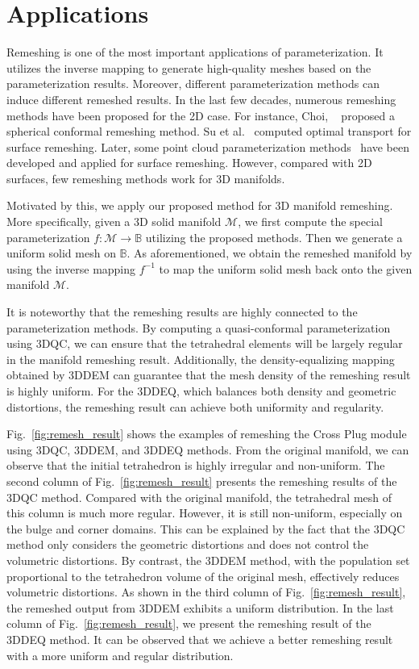 \documentclass{article}
\begin{document}
\section{Applications}\label{sec:applications}
Remeshing is one of the most important applications of parameterization. It utilizes the inverse mapping to generate high-quality meshes based on the parameterization results. Moreover, different parameterization methods can induce different remeshed results. In the last few decades, numerous remeshing methods have been proposed for the 2D case. For instance, Choi, ~\cite{choi2015flash} proposed a spherical conformal remeshing method. Su et al.~\cite{su2019curvature} computed optimal transport for surface remeshing. Later, some point cloud parameterization methods~\cite{lai2025point,choi2016spherical} have been developed and applied for surface remeshing. However, compared with 2D surfaces, few remeshing methods work for 3D manifolds. 

Motivated by this, we apply our proposed method for 3D manifold remeshing. More specifically, given a 3D solid manifold $\mathcal{M}$, we first compute the special parameterization $f:\mathcal{M} \rightarrow \mathbb B$ utilizing the proposed methods. Then we generate a uniform solid mesh on $\mathbb B$. As aforementioned, we obtain the remeshed manifold by using the inverse mapping $f^{-1}$ to map the uniform solid mesh back onto the given manifold $\mathcal{M}$.

It is noteworthy that the remeshing results are highly connected to the parameterization methods. By computing a quasi-conformal parameterization using 3DQC, we can ensure that the tetrahedral elements will be largely regular in the manifold remeshing result. Additionally, the density-equalizing mapping obtained by 3DDEM can guarantee that the mesh density of the remeshing result is highly uniform. For the 3DDEQ, which balances both density and geometric distortions, the remeshing result can achieve both uniformity and regularity. 


Fig.~\ref{fig:remesh_result} shows the examples of remeshing the Cross Plug module using 3DQC, 3DDEM, and 3DDEQ methods. From the original manifold, we can observe that the initial tetrahedron is highly irregular and non-uniform. The second column of Fig.~\ref{fig:remesh_result} presents the remeshing results of the 3DQC method. Compared with the original manifold, the tetrahedral mesh of this column is much more regular. However, it is still non-uniform, especially on the bulge and corner domains. This can be explained by the fact that the 3DQC method only considers the geometric distortions and does not control the volumetric distortions. By contrast, the 3DDEM method, with the population set proportional to the tetrahedron volume of the original mesh, effectively reduces volumetric distortions. As shown in the third column of Fig.~\ref{fig:remesh_result}, the remeshed output from 3DDEM exhibits a uniform distribution. In the last column of Fig.~\ref{fig:remesh_result}, we present the remeshing result of the 3DDEQ method. It can be observed that we achieve a better remeshing result with a more uniform and regular distribution.
\end{document}
